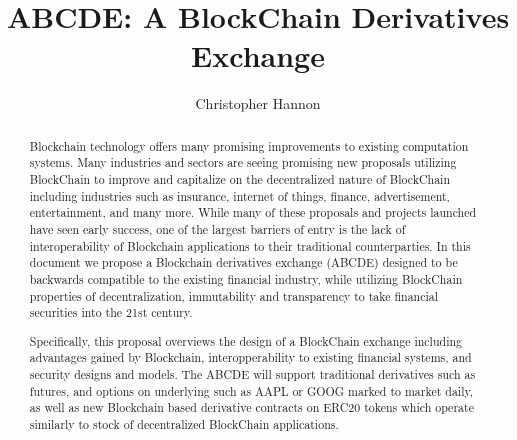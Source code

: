 \documentclass{winnower}
\begin{document}
\title{ABCDE: A BlockChain Derivatives Exchange}

\author{Christopher Hannon}

\date{}

\maketitle

\begin{abstract}
  Blockchain technology offers many promising improvements to existing computation systems.
  Many industries and sectors are seeing promising new proposals utilizing BlockChain to improve and capitalize on the decentralized nature of BlockChain including industries such as insurance, internet of things, finance, advertisement, entertainment, and many more.
  While many of these proposals and projects launched have seen early success, one of the largest barriers of entry is the lack of interoperability of Blockchain applications to their traditional counterparties.
  In this document we propose a Blockchain derivatives exchange (ABCDE) designed to be backwards compatible to the existing financial industry, while utilizing BlockChain properties of decentralization, immutability and transparency to take financial securities into the 21st century.

  Specifically, this proposal overviews the design of a BlockChain exchange including advantages gained by Blockchain, interopperability to existing financial systems, and security designs and models.
  The ABCDE will support traditional derivatives such as futures, and options on underlying such as AAPL or GOOG marked to market daily, as well as new Blockchain based derivative contracts on ERC20 tokens which operate similarly to stock of decentralized BlockChain applications.

 

\end{abstract}
\end{document}
